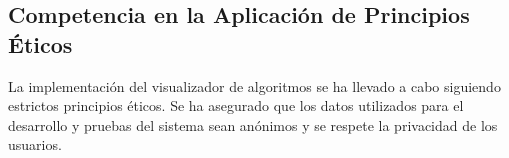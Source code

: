 \subsection{Competencia en la Aplicación de Principios Éticos}
La implementación del visualizador de algoritmos se ha llevado a cabo siguiendo estrictos principios éticos. Se ha asegurado que los datos utilizados para el desarrollo y pruebas del sistema sean anónimos y se respete la privacidad de los usuarios.
